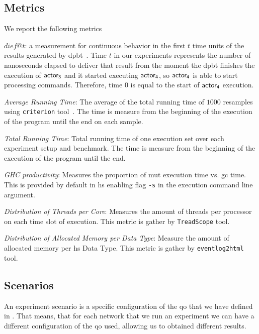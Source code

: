 \subsection{Metrics}\label{sub:metric}
We report the following metrics \begin{inparaenum}[\bf a\upshape)]
      \item {\bf $dief@t$}: a measurement for continuous behavior in the first $t$ time units of the results generated by \acrshort{dpbt}~\cite{diefpaper}. Time $t$ in our experiments represents the number of nanoseconds elapsed to deliver that result from the moment the \acrshort{dpbt} finishes the execution of $\mathsf{actor_3}$ and it started executing $\mathsf{actor_4}$, so $\mathsf{actor_4}$ is able to start processing commands. 
      Therefore, time $0$ is equal to the start of $\mathsf{actor_4}$ execution.
      \item \emph{Average Running Time}: The average of the total running time of $1000$ resamples using \texttt{criterion} tool~\cite{criterion}. The time is measure from the beginning of the execution of the program until the end on each sample.
      \item \emph{Total Running Time}: Total running time of one execution set over each experiment setup and benchmark. The time is measure from the beginning of the execution of the program until the end.
      \item \emph{GHC productivity}: Measures the proportion of \acrfull{mut} execution time vs. \acrfull{gc} time. This is provided by default in \acrshort{hs} enabling flag \texttt{-s} in the execution command line argument.
      \item \emph{Distribution of Threads per Core}: Measures the amount of threads per processor on each time slot of execution. This metric is gather by \texttt{TreadScope} \cite{threadscope} tool.
      \item \emph{Distribution of Allocated Memory per Data Type}: Measure the amount of allocated memory per \acrshort{hs} Data Type. This metric is gather by \texttt{eventlog2html} \cite{eventlog2html} tool.
  \end{inparaenum}
    
\subsection{Scenarios}\label{sub:exp:exp-data-setup}
An experiment scenario is a specific configuration of the \acrfull{qo} that we have defined in . 
That means, that for each network that we run an experiment we can have a different configuration of the \acrshort{qo} used, allowing us to obtained different results.


